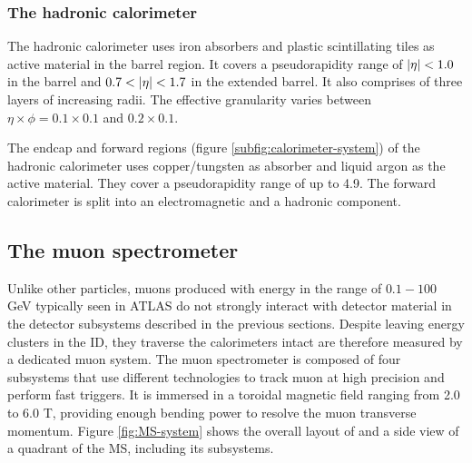 \subsubsection{The hadronic calorimeter}
The hadronic calorimeter uses iron absorbers and plastic scintillating tiles as active material in the barrel region. 
It covers a pseudorapidity range of $\abs{\eta} < 1.0$ in the barrel and $0.7 < \abs{\eta} < 1.7$ in the extended barrel. 
It also comprises of three layers of increasing radii. 
The effective granularity varies between $\eta\times\phi=0.1\times 0.1$ and $0.2\times 0.1$. 

The endcap and forward regions (figure \ref{subfig:calorimeter-system}) of the hadronic calorimeter uses copper/tungsten as absorber and liquid argon as the active material. 
They cover a pseudorapidity range of up to 4.9. 
The forward calorimeter is split into an electromagnetic and a hadronic component. 

\subsection{The muon spectrometer}
Unlike other particles, muons produced with energy in the range of $0.1-100$ GeV typically seen in ATLAS do not strongly interact with detector material in the detector subsystems described in the previous sections. 
Despite leaving energy clusters in the ID, they traverse the calorimeters intact are therefore measured by a dedicated muon system. 
The muon spectrometer is composed of four subsystems that use different technologies to track muon at high precision and perform fast triggers. 
It is immersed in a toroidal magnetic field ranging from 2.0 to 6.0 T, providing enough bending power to resolve the muon transverse momentum. 
Figure \ref{fig:MS-system} shows the overall layout of and a side view of a quadrant of the MS, including its subsystems. 

